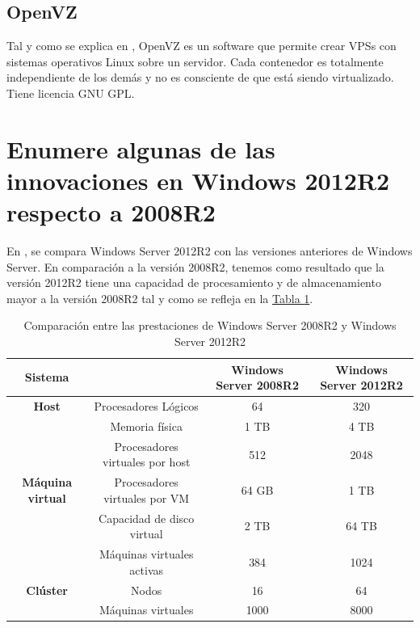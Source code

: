 \documentclass[10pt,a4paper,spanish]{article}
\numberwithin{equation}{section} %
\numberwithin{figure}{section} %
\numberwithin{table}{section} %
\begin{document}
\subsection{OpenVZ}
Tal y como se explica en \cite{openvz}, OpenVZ es un software que permite crear VPSs con sistemas operativos Linux sobre un servidor. Cada contenedor es totalmente independiente de los demás y no es consciente de que está siendo virtualizado. Tiene licencia GNU GPL.

\section{Enumere algunas de las innovaciones en Windows 2012R2 respecto a 2008R2}
En \cite{comws2012}, se compara Windows Server 2012R2 con las versiones anteriores de Windows Server. En comparación a la versión 2008R2, tenemos como resultado que la versión 2012R2 tiene una capacidad de procesamiento y de almacenamiento mayor a la versión 2008R2 tal y como se refleja en la \hyperref[prest]{Tabla \ref*{prest}}.

\begin{table}[!h]
\begin{tabular}{c | c | c | c}
Sistema & & Windows Server 2008R2 & Windows Server 2012R2 \\
\hline
\textbf{Host} & Procesadores Lógicos & 64 & 320 \\
& Memoria física & 1 TB & 4 TB \\
& Procesadores virtuales por host & 512 & 2048 \\
\hline
\textbf{Máquina virtual} & Procesadores virtuales por VM & 64 GB & 1 TB \\
& Capacidad de disco virtual & 2 TB & 64 TB \\
& Máquinas virtuales activas & 384 & 1024 \\
\hline
\textbf{Clúster} & Nodos & 16 & 64 \\
& Máquinas virtuales & 1000 & 8000 \\
\end{tabular}
\caption{Comparación entre las prestaciones de Windows Server 2008R2 y Windows Server 2012R2}
\label{prest}
\end{table}
\end{document}
